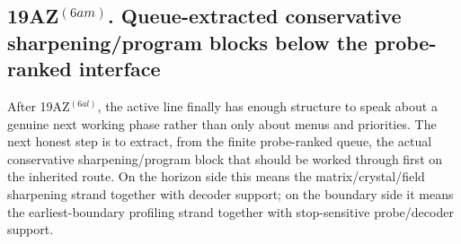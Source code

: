 \subsection*{19AZ$^{(6am)}$. Queue-extracted conservative sharpening/program blocks below the probe-ranked interface}
\label{sec:queue-extracted-conservative-sharpening-program-blocks-below-the-probe-ranked-interface}
After 19AZ$^{(6al)}$, the active line finally has enough structure to speak about a genuine next working phase rather than only about menus and priorities. The next honest step is to extract, from the finite probe-ranked queue, the actual conservative sharpening/program block that should be worked through first on the inherited route. On the horizon side this means the matrix/crystal/field sharpening strand together with decoder support; on the boundary side it means the earliest-boundary profiling strand together with stop-sensitive probe/decoder support.

